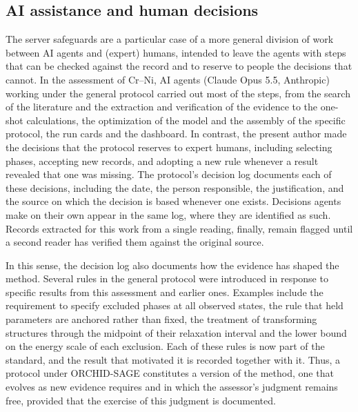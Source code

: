 \subsection{AI assistance and human decisions}
\label{sec:methods:ai}

The server safeguards are a particular case of a more general division of work between AI agents and (expert) humans, intended to leave the agents with steps that can be checked against the record and to reserve to people the decisions that cannot. In the assessment of Cr--Ni, AI agents (Claude Opus 5.5, Anthropic) working under the general protocol carried out most of the steps, from the search of the literature and the extraction and verification of the evidence to the one-shot calculations, the optimization of the model and the assembly of the specific protocol, the run cards and the dashboard. In contrast, the present author made the decisions that the protocol reserves to expert humans, including selecting phases, accepting new records, and adopting a new rule whenever a result revealed that one was missing. The protocol's decision log documents each of these decisions, including the date, the person responsible, the justification, and the source on which the decision is based whenever one exists. Decisions agents make on their own appear in the same log, where they are identified as such. Records extracted for this work from a single reading, finally, remain flagged until a second reader has verified them against the original source.

In this sense, the decision log also documents how the evidence has shaped the method. Several rules in the general protocol were introduced in response to specific results from this assessment and earlier ones. Examples include the requirement to specify excluded phases at all observed states, the rule that held parameters are anchored rather than fixed, the treatment of transforming structures through the midpoint of their relaxation interval and the lower bound on the energy scale of each exclusion. Each of these rules is now part of the standard, and the result that motivated it is recorded together with it. Thus, a protocol under ORCHID-SAGE constitutes a version of the method, one that evolves as new evidence requires and in which the assessor's judgment remains free, provided that the exercise of this judgment is documented.
